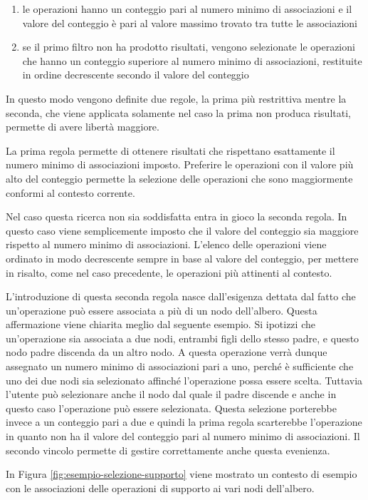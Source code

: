 \begin{enumerate}
	\item
	le operazioni hanno un conteggio pari al numero minimo di associazioni e il valore del conteggio è pari al valore massimo trovato tra tutte le associazioni
	\item
	se il primo filtro non ha prodotto risultati, vengono selezionate le operazioni che hanno un conteggio superiore al numero minimo di associazioni, restituite in ordine decrescente secondo il valore del conteggio
\end{enumerate}

In questo modo vengono definite due regole, la prima più restrittiva mentre la seconda, che viene applicata solamente nel caso la prima non produca risultati, permette di avere libertà maggiore.

La prima regola permette di ottenere risultati che rispettano esattamente il numero minimo di associazioni imposto. Preferire le operazioni con il valore più alto del conteggio permette la selezione delle operazioni che sono maggiormente conformi al contesto corrente.

Nel caso questa ricerca non sia soddisfatta entra in gioco la seconda regola. In questo caso viene semplicemente imposto che il valore del conteggio sia maggiore rispetto al numero minimo di associazioni. L'elenco delle operazioni viene ordinato in modo decrescente sempre in base al valore del conteggio, per mettere in risalto, come nel caso precedente, le operazioni più attinenti al contesto.

L'introduzione di questa seconda regola nasce dall'esigenza dettata dal fatto che un'operazione può essere associata a più di un nodo dell'albero. Questa affermazione viene chiarita meglio dal seguente esempio. Si ipotizzi che un'operazione sia associata a due nodi, entrambi figli dello stesso padre, e questo nodo padre discenda da un altro nodo. A questa operazione verrà dunque assegnato un numero minimo di associazioni pari a uno, perché è sufficiente che uno dei due nodi sia selezionato affinché l'operazione possa essere scelta. Tuttavia l'utente può selezionare anche il nodo dal quale il padre discende e anche in questo caso l'operazione può essere selezionata. Questa selezione porterebbe invece a un conteggio pari a due e quindi la prima regola scarterebbe l'operazione in quanto non ha il valore del conteggio pari al numero minimo di associazioni. Il secondo vincolo permette di gestire correttamente anche questa evenienza.

In Figura \ref{fig:esempio-selezione-supporto} viene mostrato un contesto di esempio con le associazioni delle operazioni di supporto ai vari nodi dell'albero.

